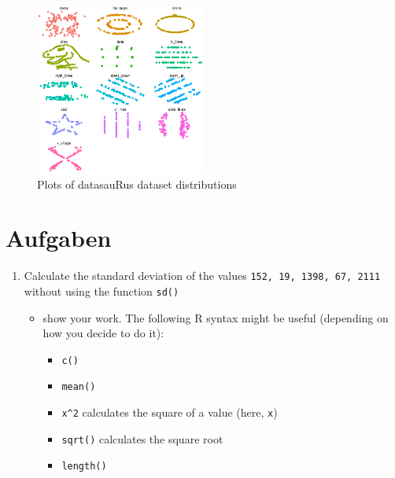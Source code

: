 \documentclass[
  letterpaper,
  DIV=11]{scrartcl}
\providecommand{\tightlist}{%
  \setlength{\itemsep}{0pt}\setlength{\parskip}{0pt}}\usepackage{longtable,booktabs,array}
\begin{document}
\begin{figure}

{\centering \includegraphics[width=0.5\textwidth,height=\textheight]{_descr_stats_EN_files/figure-pdf/fig-datasauRus-1.pdf}

}

\caption{\label{fig-datasauRus}Plots of datasauRus dataset
distributions}

\end{figure}

\hypertarget{aufgaben}{%
\section{Aufgaben}\label{aufgaben}}

\begin{enumerate}
\def\labelenumi{\arabic{enumi}.}
\tightlist
\item
  Calculate the standard deviation of the values
  \texttt{152,\ 19,\ 1398,\ 67,\ 2111} without using the function
  \texttt{sd()}

  \begin{itemize}
  \tightlist
  \item
    show your work. The following R syntax might be useful (depending on
    how you decide to do it):

    \begin{itemize}
    \tightlist
    \item
      \texttt{c()}
    \item
      \texttt{mean()}
    \item
      \texttt{x\^{}2} calculates the square of a value (here,
      \texttt{x})
    \item
      \texttt{sqrt()} calculates the square root
    \item
      \texttt{length()}
    \end{itemize}
  \end{itemize}
\end{enumerate}
\end{document}
